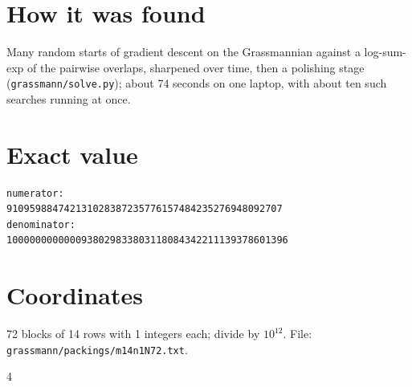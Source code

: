 \documentclass[11pt,a4paper]{article}
\begin{document}
\section{How it was found}
Many random starts of gradient descent on the Grassmannian against a log-sum-exp of the pairwise overlaps, sharpened over time, then a polishing stage (\texttt{grassmann/solve.py}); about 74 seconds on one laptop, with about ten such searches running at once.


\appendix
\section{Exact value}
{\small
\begin{verbatim}
numerator:
910959884742131028387235776157484235276948092707
denominator:
1000000000000938029833803118084342211139378601396
\end{verbatim}}

\section{Coordinates}
72 blocks of 14 rows with 1 integers each; divide by $10^{12}$. File: \texttt{grassmann/packings/m14n1N72.txt}.
{\tiny
\begin{multicols}{4}
\end{multicols}}
\end{document}
